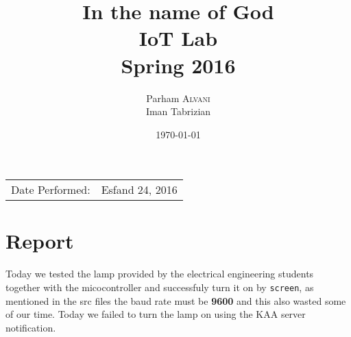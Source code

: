 \documentclass{article}
\title{In the name of God \\ IoT Lab \\ Spring 2016} %
\author{Parham \textsc{Alvani} \\ Iman Tabrizian} %
\date{\today} %
\begin{document}
\maketitle %

\begin{center}
\begin{tabular}{l r}
    Date Performed: & Esfand 24, 2016 \\ %
\end{tabular}
\end{center}



\section{Report}

Today we tested the lamp provided by the electrical engineering students together
with the micocontroller and successfuly turn it on by \texttt{screen}, as mentioned
in the src files the baud rate must be \textbf{9600} and this also wasted some
of our time. Today we failed to turn the lamp on using the KAA server notification.
\end{document}
